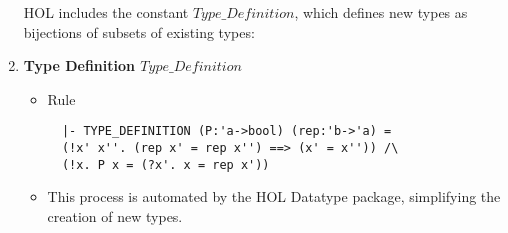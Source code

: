 \begin{enumerate}
HOL includes the constant \(Type\_Definition\), which defines new types as bijections of subsets of existing types:
    \item \textbf{Type Definition \(Type\_Definition\)}
    \begin{itemize}
        \item Rule
          \begin{hol}
\begin{verbatim}
  |- TYPE_DEFINITION (P:'a->bool) (rep:'b->'a) =
  (!x' x''. (rep x' = rep x'') ==> (x' = x'')) /\
  (!x. P x = (?x'. x = rep x'))
\end{verbatim}
          \end{hol}
        \item This process is automated by the HOL Datatype package, simplifying the creation of new types.

    \end{itemize}


\end{enumerate}

